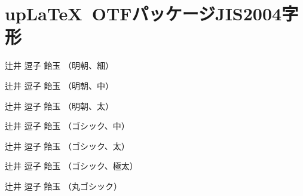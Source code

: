 \documentclass[uplatex]{jsarticle}
\begin{document}
\section{up\LaTeX~OTFパッケージJIS2004字形}

\selectfont
辻井 逗子 飴玉 （明朝、細）

\selectfont
辻井 逗子 飴玉 （明朝、中）

\selectfont
辻井 逗子 飴玉 （明朝、太）

\selectfont
辻井 逗子 飴玉 （ゴシック、中）

\selectfont
辻井 逗子 飴玉 （ゴシック、太）

\selectfont
辻井 逗子 飴玉 （ゴシック、極太）

\selectfont
辻井 逗子 飴玉 （丸ゴシック）
\end{document}
